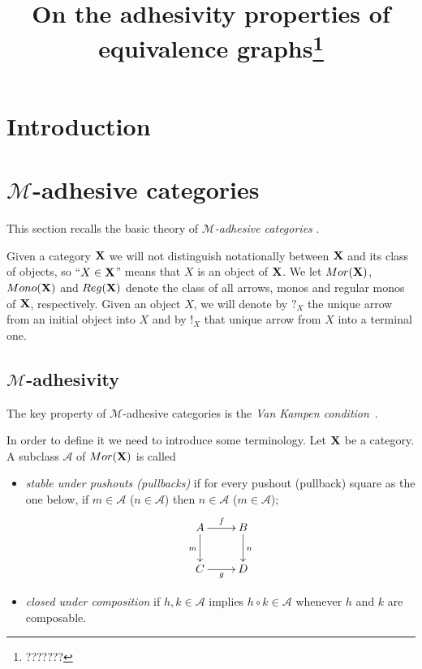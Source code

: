 \documentclass[runningheads,envcountsect]{lipics-v2021}
\title{On the adhesivity properties of equivalence graphs\thanks{???????}}
\def\X{\textbf {\textup{X}}}
\newcommand{\mor}{\mathsf{Mor}}
\newcommand{\mon}{\mathsf{Mono}}
\newcommand{\reg}{\mathsf{Reg}}
\begin{document}
	\maketitle {}
	\begin{abstract}
	\end{abstract}


\section{Introduction}
\section{$\mathcal{M}$-adhesive categories}


This  section recalls the basic theory of \emph{$\mathcal{M}$-adhesive categories} \cite{azzi2019essence,ehrig2012,ehrig2014adhesive,lack2005adhesive,heindel2009category}. 

Given a category $\X$ we will not distinguish notationally between $\X$ and its class of objects, so
``$X\in \X$'' means that $X$ is an object of $\X$. We let $\mor(\X)$, $\mon(\X)$ and $\reg(\X)$ denote the class of all arrows, monos and regular monos of $\X$, respectively.  Given an object $X$, we will denote by $?_X$ the unique arrow from an initial object into $X$ and by $!_X$ that  unique arrow from $X$ into a terminal one.

\subsection{$\mathcal{M}$-adhesivity}\label{subsec:ade}
The key property of $\mathcal{M}$-adhesive categories is the \emph{Van Kampen condition}~\cite{brown1997van,johnstone2007quasitoposes,lack2005adhesive}. 

In order to define it we need to introduce some terminology.  Let  $\X$ be a category. A subclass $\mathcal{A}$ of $\mor(\X)$ is called
\begin{itemize}
	\item		\emph{stable under pushouts (pullbacks)} if for every pushout (pullback) square as the one  below, if $m \in \mathcal{A}$ ($n\in \mathcal{A}$) then $n \in \mathcal{A}$ ($m \in \mathcal{A}$);
	\[\xymatrix{A \ar[r]^{f} \ar[d]_{m}& B \ar[d]^{n} \\ C \ar[r]_{g} & D}\]
		\item \emph{closed under composition} if $h, k\in \mathcal{A}$ implies $h\circ k\in \mathcal{A}$ whenever $h$ and $k$ are composable.
\end{itemize}
\end{document}

